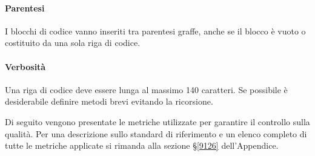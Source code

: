 \paragraph*{Parentesi}
I blocchi di codice vanno inseriti tra parentesi graffe, anche se il blocco è vuoto o costituito da una sola riga di codice.
\paragraph*{Verbosità}
Una riga di codice deve essere lunga al massimo 140 caratteri.
Se possibile è desiderabile definire metodi brevi evitando la ricorsione.

\label{MCodifica}
Di seguito vengono presentate le metriche utilizzate per garantire il controllo sulla qualità. Per una descrizione sullo standard di riferimento e un elenco completo di tutte le metriche applicate si rimanda alla sezione \S\ref{9126} dell'Appendice. 
